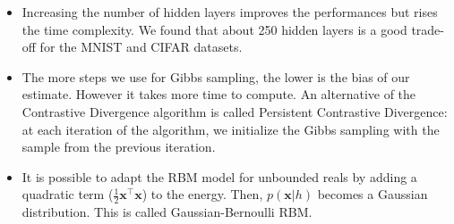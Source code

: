 \documentclass[landscape,a1paper,fontscale=0.5]{baposter} %
\newcommand{\compresslist}{ %
\setlength{\itemsep}{1pt}
\setlength{\parskip}{0pt}
\setlength{\parsep}{0pt}
}
\begin{document}
\begin{poster}
{\begin{multicols}{2}
\begin{itemize}\compresslist
\item Increasing the number of hidden layers improves the performances but rises the time complexity. We found that about 250 hidden layers is a good trade-off for the MNIST and CIFAR datasets.
\item The more steps we use for Gibbs sampling, the lower is the bias of our estimate. However it takes more time to compute. An alternative of the Contrastive Divergence algorithm is called Persistent Contrastive Divergence: at each iteration of the algorithm, we initialize the Gibbs sampling with the sample from the previous iteration.
\item It is possible to adapt the RBM model for unbounded reals by adding a quadratic term ($\frac{1}{2}\mathbf{x}^\top \mathbf{x}$) to the energy. Then, $p(\mathbf{x}|h)$ becomes a Gaussian distribution. This is called Gaussian-Bernoulli RBM.
\end{itemize}
\end{multicols}


}



\end{poster}
\end{document}
